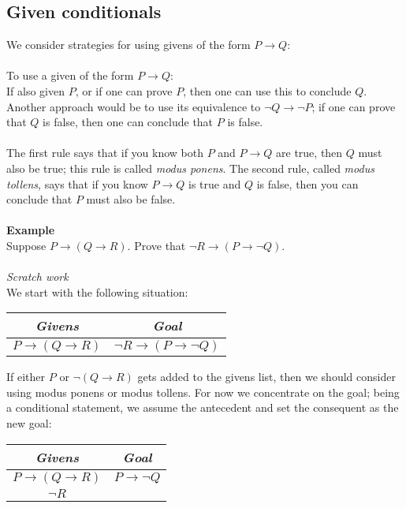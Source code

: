 \documentclass{report}
\theoremstyle{definition}
\begin{document}
\subsection{Given conditionals}
We consider strategies for using givens of the form $P\to Q$:\\
\vspace{1mm}\\
\indent To use a given of the form $P\to Q$:\\
\indent If also given $P$, or if one can prove $P$, then one can use this to conclude $Q$. Another approach would be to use its equivalence to $\neg Q\to\neg P$; if one can prove that
$Q$ is false, then one can conclude that $P$ is false.\\
\vspace{1mm}\\
The first rule says that if you know both $P$ and $P\to Q$ are true, then $Q$ must also be true; this rule is called \textit{modus ponens}. The second rule, called \textit{modus tollens}, 
says that if you know $P\to Q$ is true and $Q$ is false, then you can conclude that $P$ must also be false.\\
\vspace{1mm}\\
\textbf{Example}\\
Suppose $P\to(Q\to R)$. Prove that $\neg R\to(P\to\neg Q)$.\\
\vspace{1mm}\\
\textit{Scratch work}\\
We start with the following situation:
\begin{center}
\begin{tabular}{c|c}
\textit{Givens}&\textit{Goal}\\
\hline
$P\to(Q\to R)$&$\neg R\to(P\to\neg Q)$\\
\end{tabular}
\end{center}
If either $P$ or $\neg(Q\to R)$ gets added to the givens list, then we should consider using modus ponens or modus tollens. For now we concentrate on the goal; being a conditional statement, 
we assume the antecedent and set the consequent as the new goal:
\begin{center}
\begin{tabular}{c|c}
\textit{Givens}&\textit{Goal}\\
\hline
$P\to(Q\to R)$&$P\to\neg Q$\\
$\neg R$&
\end{tabular}
\end{center}
\end{document}
